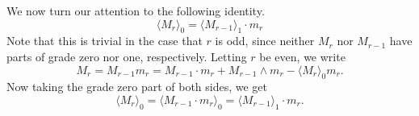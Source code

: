 \documentclass{birkjour}
\theoremstyle{definition}
\theoremstyle{remark}
\numberwithin{equation}{section}
\begin{document}
We now turn our attention to the following identity.
\begin{equation}\label{equ_gr_zero_part_of_Mr}
\langle M_r\rangle_0 = \langle M_{r-1}\rangle_1\cdot m_r
\end{equation}
Note that this is trivial in the case that $r$ is odd, since neither $M_r$ nor $M_{r-1}$ have parts of grade zero nor one, respectively.
Letting $r$ be even, we write
\begin{equation*}
M_r = M_{r-1}m_r = M_{r-1}\cdot m_r + M_{r-1}\wedge m_r - \langle M_r\rangle_0 m_r.
\end{equation*}
Now taking the grade zero part of both sides, we get
\begin{equation*}
\langle M_r\rangle_0 = \langle M_{r-1}\cdot m_r\rangle_0 = \langle M_{r-1}\rangle_1\cdot m_r.
\end{equation*}
\end{document}
